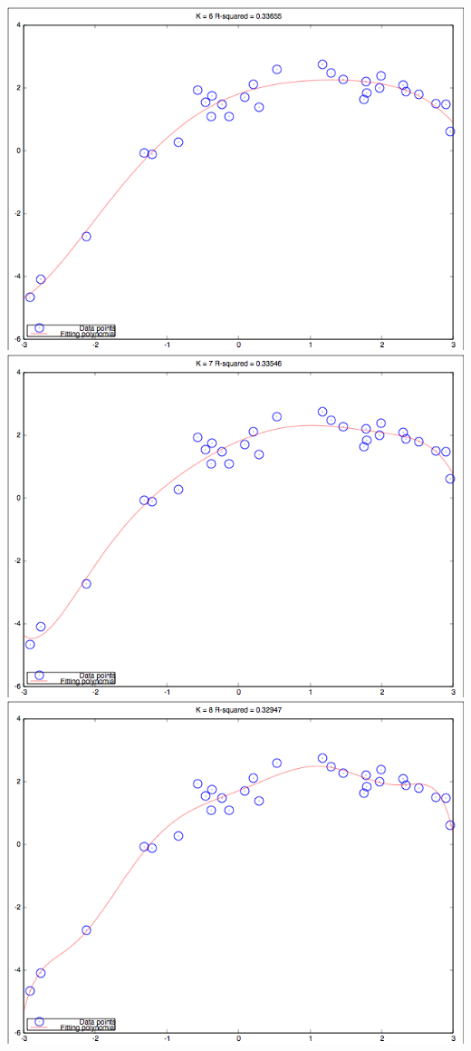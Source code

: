 \documentclass[10pt]{article}
\begin{document}
\begin{itemize}
  \includegraphics[width=\textwidth,height=\textheight,keepaspectratio]{K6}
  \includegraphics[width=\textwidth,height=\textheight,keepaspectratio]{K7}
  \includegraphics[width=\textwidth,height=\textheight,keepaspectratio]{K8}

\end{itemize}
\end{document}
